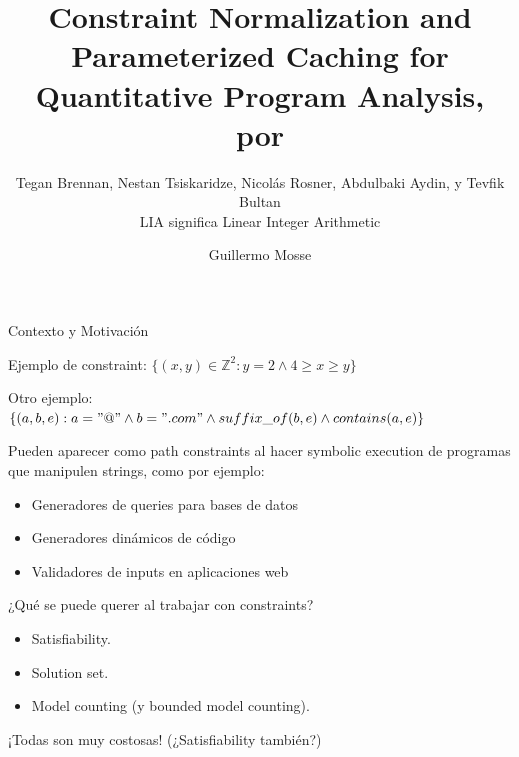 \documentclass[10pt]{beamer}
\begin{document}


\title{Constraint Normalization and Parameterized Caching for Quantitative Program Analysis, por }
\subtitle{Tegan Brennan, Nestan Tsiskaridze, Nicolás Rosner, Abdulbaki Aydin, y Tevfik Bultan\\\tiny{LIA significa Linear Integer Arithmetic}}
\date{}
\author{Guillermo Mosse}

\maketitle


\begin{frame}{Contexto y Motivación}

Ejemplo de constraint: $\{(x,y) \in \mathbb{Z}^2 : y = 2 \land 4 \geq x \geq y\}$

Otro ejemplo: $\{ (a,b,e) : a = "@" \land b = ".com" \land suffix\_of(b,e) \land contains(a,e)\}$

Pueden aparecer como path constraints al hacer symbolic execution de programas que manipulen strings, como por ejemplo:
\begin{itemize}
	\item Generadores de queries para bases de datos
	\item Generadores dinámicos de código
	\item Validadores de inputs en aplicaciones web
\end{itemize} \pause

¿Qué se puede querer al trabajar con constraints?

\begin{itemize}
	\item Satisfiability.
	\item Solution set.
	\item Model counting (y bounded model counting).
\end{itemize}

¡Todas son muy costosas! (¿Satisfiability también?)
	
\end{frame}
\end{document}
